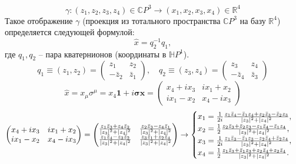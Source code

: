 \documentclass[12pt]{article}
\theoremstyle{definition}
\begin{document}
\begin{equation}
    \gamma:(z_1,z_2,z_3,z_4)\in\mathbb{C}P^3\rightarrow (x_1,x_2,x_3,x_4)\in\mathbb{R}^4
\end{equation}
Такое отображение $\gamma$ (проекция из тотального пространства $\mathbb{C}P^3$ на базу $\mathbb{R}^4$) определяется следующей формулой:
\begin{equation}
    \hat{x}=q_2^{-1}q_1,
\end{equation}
где $q_1,q_2$ -- пара кватернионов (координаты в $\mathbb{H}P^1$).
\begin{equation}
    q_1\equiv(z_1,z_2)=\begin{pmatrix}
        z_1 & z_2\\
        -\bar{z}_2 & \bar{z}_1
    \end{pmatrix},\quad q_2\equiv(z_3,z_4)=\begin{pmatrix}
        z_3 & z_4\\
        -\bar{z}_4 & \bar{z}_3
    \end{pmatrix}
\end{equation}
\begin{equation}
    \hat{x}=x_\mu\sigma^\mu=x_4\bm{1}+i\bm{\sigma}\bm{x}=\begin{pmatrix}
        x_4+ix_3 & ix_1+x_2\\
        ix_1-x_2 & x_4-ix_3
    \end{pmatrix}
\end{equation}
\begin{equation}
    \begin{pmatrix}
        x_4+ix_3 & ix_1+x_2\\
        ix_1-x_2 & x_4-ix_3
    \end{pmatrix}=\begin{pmatrix}
        \frac{z_1\bar{z}_3+z_4\bar{z}_2}{|z_3|^2+|z_4|^2} & \frac{z_2\bar{z}_3-z_4\bar{z}_1}{|z_3|^2+|z_4|^2}\\
        \frac{z_1\bar{z}_4-z_3\bar{z}_2}{|z_3|^2+|z_4|^2} & \frac{z_3\bar{z}_1+z_2\bar{z}_4}{|z_3|^2+|z_4|^2}
    \end{pmatrix}\rightarrow\begin{cases}
        x_1=\frac{1}{2i}\frac{z_1\bar{z}_4-\bar{z}_1z_4+z_2\bar{z}_3-\bar{z}_2z_3}{|z_3|^2+|z_4|^2},\\
        x_2=\frac{1}{2}\frac{z_2\bar{z}_3+\bar{z}_2z_3-z_1\bar{z}_4-\bar{z}_1z_4}{|z_3|^2+|z_4|^2},\\
        x_3=\frac{1}{2i}\frac{z_1\bar{z}_3-\bar{z}_1z_3-z_2\Bar{z}_4+\bar{z}_2z_4}{|z_3|^2+|z_4|^2},\\
        x_4=\frac{1}{2}\frac{z_1\bar{z}_3+\bar{z}_1z_3+z_2\bar{z}_4+z_2\bar{z}_4}{|z_3|^2+|z_4|^2}.
    \end{cases}
\end{equation}
\end{document}
